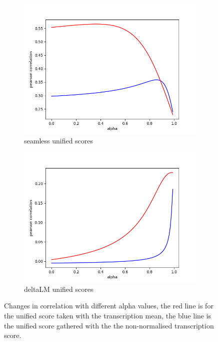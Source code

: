 \begin{figure}[ht]
    \centering
    \begin{subfigure}{0.4\linewidth}
        \includegraphics[width=\linewidth]{Latex/sections/images/seamlessuniscoredistribution.png}
        \caption{seamless unified scores}
    \end{subfigure}
    \begin{subfigure}{0.4\linewidth}
        \includegraphics[width=\linewidth]{Latex/sections/images/dlmuniscoredistribution.png}
        \caption{deltaLM unified scores}
    \end{subfigure}
    
    \caption{Changes in correlation with different alpha values, the red line is for the unified score taken with the transcription mean, the blue line is the unified score gathered with the the non-normalised transcription score. }
    \label{fig:uniscore correlation}
\end{figure}

